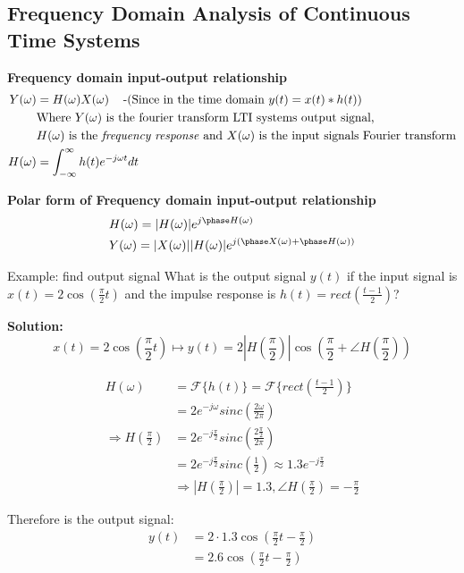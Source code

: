 \subsection{Frequency Domain Analysis of Continuous Time Systems}
\textbf{Frequency domain input-output relationship}
\begin{align*}
    Y(\omega) &= H(\omega)X(\omega) \;\;\; \text{ -(Since in the time domain $y(t)=x(t)*h(t)$)} \\
    &\text{Where $Y(\omega)$ is the fourier transform LTI systems output signal,} \\
    &\text{$H(\omega)$ is the \textit{frequency response} and $X(\omega)$ is the input signals Fourier transform} \\
    H(\omega) &= \int_{-\infty}^{\infty} h(t)e^{-j\omega t} dt
\end{align*}

\noindent\textbf{Polar form of Frequency domain input-output relationship}
\begin{align*}
    &H(\omega) = |H(\omega)|e^{j\phase H(\omega)} \\
    &Y(\omega) = |X(\omega)||H(\omega)|e^{j(\phase X(\omega) + \phase H(\omega))}
\end{align*}

\begin{exampleblock}{Example: find output signal}
  What is the output signal $y(t)$ if the input signal is $x(t)=2\cos\left(\frac{\pi}{2}t\right)$
  and the impulse response is $h(t)=rect\left(\frac{t-1}{2}\right)$?

    \textbf{Solution:}
    \begin{equation*}
        x(t)=2\cos\left(\frac{\pi}{2}t\right) \mapsto y(t)=2|H\left(\frac{\pi}{2}\right)|\cos\left(\frac{\pi}{2}+\angle H\left(\frac{\pi}{2}\right)\right)
    \end{equation*}

    \begin{align*}
        H(\omega) &= \mathcal{F}\{ h(t) \} = \mathcal{F}\{ rect\left(\frac{t-1}{2}\right) \} \\
        &=2e^{-j\omega}sinc\left(\frac{2\omega}{2\pi}\right) \\
        \Rightarrow H\left(\frac{\pi}{2}\right) &= 2e^{-j\frac{\pi}{2}}sinc\left(\frac{2\frac{\pi}{2}}{2\pi}\right) \\
        &= 2e^{-j\frac{\pi}{2}}sinc\left(\frac{1}{2}\right) \approx 1.3e^{-j\frac{\pi}{2}} \\
        &\Rightarrow |H\left(\frac{\pi}{2}\right)|=1.3, \angle H\left(\frac{\pi}{2}\right) = -\frac{\pi}{2}
    \end{align*}

    Therefore is the output signal:
    \begin{align*}
        y(t) &= 2\cdot 1.3\cos\left(\frac{\pi}{2}t-\frac{\pi}{2}\right) \\
        &= 2.6 \cos\left(\frac{\pi}{2}t-\frac{\pi}{2}\right)
    \end{align*}
\end{exampleblock}


